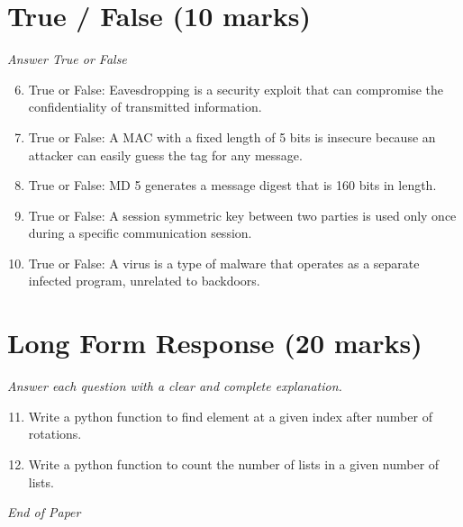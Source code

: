 \documentclass[12pt]{article}
\begin{document}
\section*{True / False (10 marks)}
\textit{Answer True or False}
\begin{enumerate}[label=\arabic*.]
\setcounter{enumi}{5}
\item True or False: Eavesdropping is a security exploit that can compromise the confidentiality of transmitted information.
\item True or False: A MAC with a fixed length of 5 bits is insecure because an attacker can easily guess the tag for any message.
\item True or False: MD 5 generates a message digest that is 160 bits in length.
\item True or False: A session symmetric key between two parties is used only once during a specific communication session.
\item True or False: A virus is a type of malware that operates as a separate infected program, unrelated to backdoors.
\end{enumerate}

\section*{Long Form Response (20 marks)}
\textit{Answer each question with a clear and complete explanation.}
\begin{enumerate}[label=\arabic*.]
\setcounter{enumi}{10}
\item Write a python function to find element at a given index after number of rotations.
\item Write a python function to count the number of lists in a given number of lists.
\end{enumerate}

\vfill
\noindent\textit{End of Paper}
\end{document}
